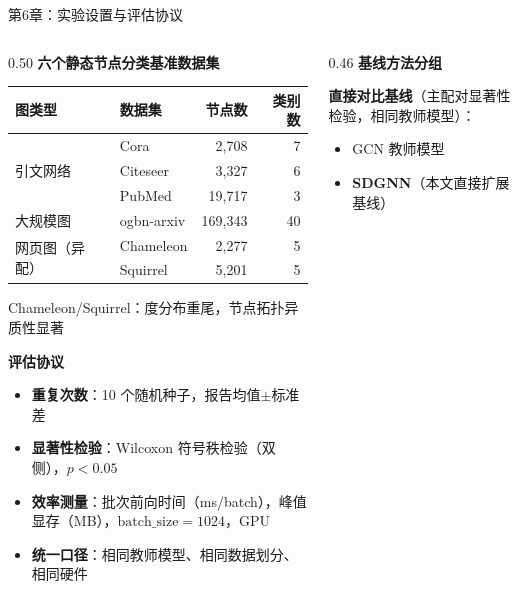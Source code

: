 \documentclass[aspectratio=169,9pt,xcolor=dvipsnames]{beamer}
\newcommand{\highlight}[1]{\textcolor{myred}{\textbf{#1}}}
\newcommand{\blue}[1]{\textcolor{mynavy}{#1}}
\begin{document}
\begin{frame}{第6章：实验设置与评估协议}
  \begin{columns}[T]
    \begin{column}{0.50\textwidth}
      \textbf{\blue{六个静态节点分类基准数据集}}
      \begin{center}\small
      \begin{tabular}{llrr}
        \toprule
        图类型 & 数据集 & 节点数 & 类别数 \\
        \midrule
        \multirow{3}{*}{引文网络}
          & Cora       &   2,708 & 7 \\
          & Citeseer   &   3,327 & 6 \\
          & PubMed     &  19,717 & 3 \\
        \midrule
        大规模图 & ogbn-arxiv & 169,343 & 40 \\
        \midrule
        \multirow{2}{*}{网页图（异配）}
          & Chameleon  &   2,277 & 5 \\
          & Squirrel   &   5,201 & 5 \\
        \bottomrule
      \end{tabular}
      \end{center}
      \vspace{0.05cm}\footnotesize Chameleon/Squirrel：度分布重尾，节点拓扑异质性显著

      \vspace{0.2cm}
      \textbf{\blue{评估协议}}
      \begin{itemize}
        \item \textbf{重复次数}：10 个随机种子，报告均值$\pm$标准差
        \item \textbf{显著性检验}：Wilcoxon 符号秩检验（双侧），$p<0.05$
        \item \textbf{效率测量}：批次前向时间（ms/batch），峰值显存（MB），$\mathrm{batch\_size}=1024$，GPU
        \item \textbf{统一口径}：相同教师模型、相同数据划分、相同硬件
      \end{itemize}
    \end{column}

    \begin{column}{0.46\textwidth}
      \textbf{\blue{基线方法分组}}

      \textbf{直接对比基线}（主配对显著性检验，相同教师模型）：
      \begin{itemize}
        \item GCN 教师模型
        \item \highlight{SDGNN}（本文直接扩展基线）
      \end{itemize}


\end{column}
\end{columns}
\end{frame}
\end{document}
